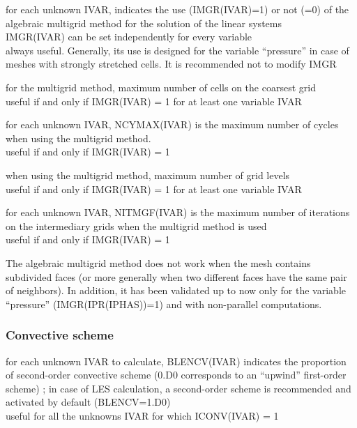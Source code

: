{for each unknown IVAR, indicates the use (IMGR(IVAR)=1) or not (=0) of the
algebraic multigrid method for the solution of the linear systems\\
IMGR(IVAR) can be set independently for every variable\\
always useful. Generally, its use is designed for the variable ``pressure'' in
case of meshes with strongly stretched cells. It is recommended not to modify
IMGR}

{for the multigrid method, maximum number of cells on the coarsest grid\\
useful if and only if IMGR(IVAR) = 1 for at least one variable IVAR}

{for each unknown IVAR, NCYMAX(IVAR) is the maximum number of cycles when using
the multigrid method.\\
useful if and only if IMGR(IVAR) = 1}

{when using the multigrid method, maximum number of grid levels\\
useful if and only if IMGR(IVAR) = 1 for at least one variable IVAR}

{for each unknown IVAR, NITMGF(IVAR) is the maximum number of iterations on the intermediary
grids when the multigrid method is used\\
useful if and only if IMGR(IVAR) = 1}

The algebraic multigrid method does not work when the mesh contains
subdivided faces (or more generally when two different faces have the
same pair of neighbors). In addition, it has been validated up to now only for
the variable ``pressure'' (IMGR(IPR(IPHAS))=1) and with non-parallel computations.

\subsubsection{Convective scheme}

{for each unknown IVAR to calculate, BLENCV(IVAR) indicates the proportion of
second-order convective scheme (0.D0 corresponds to an
``upwind'' first-order scheme) ; in case of LES calculation, a
second-order scheme is recommended and activated by default (BLENCV=1.D0)\\
useful for all the unknowns IVAR for which ICONV(IVAR) = 1}

